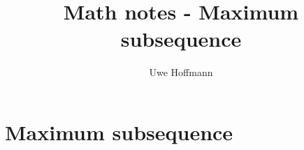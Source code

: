 

\title{Math notes - Maximum subsequence}
\author{Uwe Hoffmann}



\setcounter{chapter}{0}
\chapter{Maximum subsequence}
